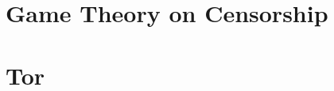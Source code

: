\documentclass{article}
\begin{document}
\section{Game Theory on Censorship}
\section{Tor}
\end{document}
